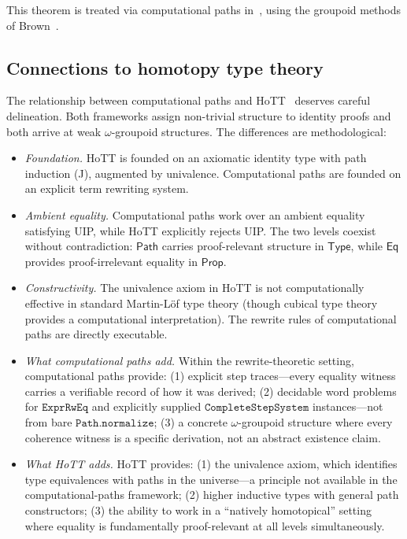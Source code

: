 \documentclass[manuscript]{BSLstyle}
\newcommand{\Path}{\mathsf{Path}}
\newcommand{\Eq}{\mathsf{Eq}}
\newcommand{\Type}{\mathsf{Type}}
\newcommand{\Prop}{\mathsf{Prop}}
\begin{document}
This theorem is treated via computational paths
in~\cite{RamosDeVerasDeQueirozDeOliveira2025svk}, using the groupoid
methods of Brown~\cite{Brown06,BrownHigginsSivera11}.

\subsection{Connections to homotopy type theory}

The relationship between computational paths and HoTT~\cite{hottbook}
deserves careful delineation.  Both frameworks assign non-trivial
structure to identity proofs and both arrive at weak $\omega$-groupoid
structures.  The differences are methodological:

\begin{itemize}
\item \emph{Foundation.}  HoTT is founded on an axiomatic identity
  type with path induction (J), augmented by univalence.
  Computational paths are founded on an explicit term rewriting system.

\item \emph{Ambient equality.}  Computational paths work over an ambient
  equality satisfying UIP, while HoTT explicitly rejects UIP.  The two
  levels coexist without contradiction: $\Path$ carries proof-relevant
  structure in $\Type$, while $\Eq$ provides proof-irrelevant equality
  in $\Prop$.

\item \emph{Constructivity.}  The univalence axiom in HoTT is not
  computationally effective in standard Martin-L\"of type theory
  (though cubical type theory~\cite{CCHM18} provides a computational
  interpretation).  The rewrite rules of computational paths are
  directly executable.

\item \emph{What computational paths add.}  Within the rewrite-theoretic
  setting, computational paths provide: (1) explicit step traces---every
  equality witness carries a verifiable record of how it was derived;
  (2) decidable word problems for \(\texttt{ExprRwEq}\) and explicitly
  supplied \(\texttt{CompleteStepSystem}\) instances---not from bare
  \(\texttt{Path.normalize}\); (3) a concrete
  $\omega$-groupoid structure where every coherence witness is a specific
  derivation, not an abstract existence claim.

\item \emph{What HoTT adds.}  HoTT provides: (1) the univalence axiom,
  which identifies type equivalences with paths in the universe---a
  principle not available in the computational-paths framework;
  (2) higher inductive types with general path constructors;
  (3) the ability to work in a ``natively homotopical'' setting where
  equality is fundamentally proof-relevant at all levels simultaneously.
\end{itemize}
\end{document}
